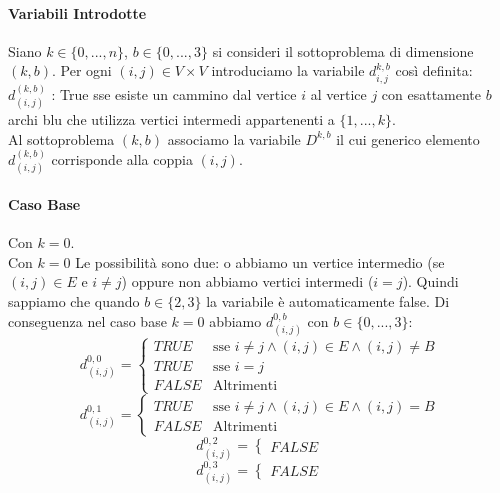 \documentclass[12pt, a4paper, openany]{book}
\begin{document}
\paragraph*{Variabili Introdotte}
Siano $k\in \{0,...,n\}$, $b\in \{0,...,3\}$ si consideri il sottoproblema di dimensione $(k,b)$.
Per ogni $(i,j)\in V\times V$ introduciamo la variabile $d_{i,j}^{k,b}$ così definita:
\\$d_{(i,j)}^{(k,b)}$ : True sse esiste un cammino dal vertice $i$ al vertice $j$ con esattamente $b$ archi blu
che utilizza vertici intermedi appartenenti a $\{1,...,k\}$.
\\Al sottoproblema $(k,b)$ associamo la variabile $D^{k,b}$ il cui generico elemento $d^{(k,b)}_{(i,j)}$ corrisponde alla coppia $(i,j)$.

\paragraph*{Caso Base} Con $k=0$.
\\Con $k=0$ Le possibilità sono due: o abbiamo un vertice intermedio (se $(i,j)\in E$ e $i\neq j$) oppure non abbiamo vertici intermedi ($i=j$).
Quindi sappiamo che quando $b\in\{2,3\}$ la variabile è automaticamente false. Di conseguenza nel caso base $k=0$ abbiamo $d_{(i,j)}^{0,b}$ con $b\in \{0,...,3\}$:
$$
d_{(i,j)}^{0,0}= \begin{cases}
	TRUE & \text{sse } i\neq j \wedge (i,j)\in E \wedge (i,j) \neq B\\
	TRUE & \text{sse } i=j \\
	FALSE & \text{Altrimenti}
\end{cases}
$$
$$
d_{(i,j)}^{0,1}= \begin{cases}
	TRUE & \text{sse } i\neq j \wedge (i,j)\in E \wedge (i,j) = B\\
	FALSE & \text{Altrimenti}
\end{cases}
$$
$$
d_{(i,j)}^{0,2}= \begin{cases}
	FALSE
\end{cases}
$$
$$
d_{(i,j)}^{0,3}= \begin{cases}
	FALSE
\end{cases}
$$
\end{document}
